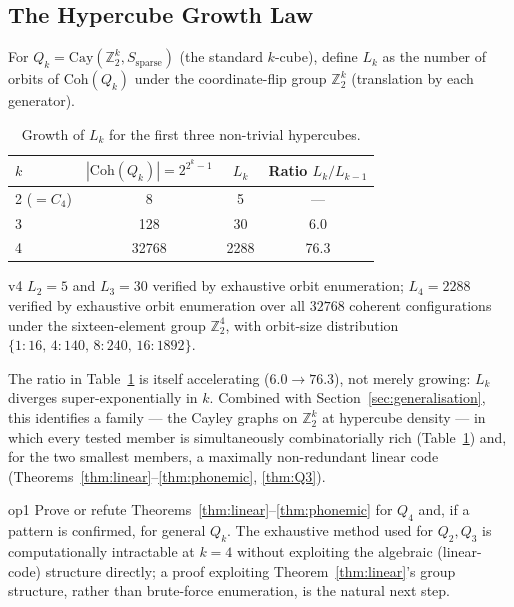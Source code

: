 \documentclass[11pt,a4paper]{article}
\newcommand{\Coh}{\mathrm{Coh}}
\newcommand{\Zsub}{\mathbb{Z}_2}
\begin{document}
\subsection{The Hypercube Growth Law}

For $Q_k=\mathrm{Cay}(\Zsub^k,S_{\mathrm{sparse}})$ (the standard $k$-cube), define $L_k$ as the number of orbits of $\Coh(Q_k)$ under the coordinate-flip group $\Zsub^k$ (translation by each generator).

\begin{table}[h]
\centering
\caption{Growth of $L_k$ for the first three non-trivial hypercubes.}
\begin{tabular}{lccc}
\toprule
$k$ & $|\Coh(Q_k)|=2^{2^k-1}$ & $L_k$ & Ratio $L_k/L_{k-1}$ \\
\midrule
2 ($=C_4$) & 8 & 5 & --- \\
3 & 128 & 30 & 6.0 \\
4 & 32768 & 2288 & 76.3 \\
\bottomrule
\end{tabular}
\label{tab:growth}
\end{table}

\begin{verifbox}{}{v4}
$L_2=5$ and $L_3=30$ verified by exhaustive orbit enumeration; $L_4=2288$ verified by exhaustive orbit enumeration over all $32768$ coherent configurations under the sixteen-element group $\Zsub^4$, with orbit-size distribution $\{1{:}16,\,4{:}140,\,8{:}240,\,16{:}1892\}$.
\end{verifbox}

The ratio in Table~\ref{tab:growth} is itself accelerating ($6.0\to76.3$), not merely growing: $L_k$ diverges super-exponentially in $k$. Combined with Section~\ref{sec:generalisation}, this identifies a family --- the Cayley graphs on $\Zsub^k$ at hypercube density --- in which every tested member is simultaneously combinatorially rich (Table~\ref{tab:growth}) and, for the two smallest members, a maximally non-redundant linear code (Theorems~\ref{thm:linear}--\ref{thm:phonemic}, \ref{thm:Q3}).

\begin{openprobbox}{}{op1}
Prove or refute Theorems~\ref{thm:linear}--\ref{thm:phonemic} for $Q_4$ and, if a pattern is confirmed, for general $Q_k$. The exhaustive method used for $Q_2,Q_3$ is computationally intractable at $k=4$ without exploiting the algebraic (linear-code) structure directly; a proof exploiting Theorem~\ref{thm:linear}'s group structure, rather than brute-force enumeration, is the natural next step.
\end{openprobbox}
\end{document}
